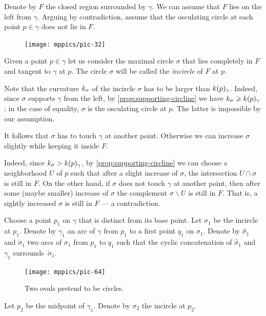 Denote by $F$ the closed region surrounded by $\gamma$.
We can assume that $F$ lies on the left from $\gamma$.
Arguing by contradiction,
assume that the osculating circle at each point $p\in \gamma$ does not lie in $F$.

\begin{figure}[h!]%
\vskip-0mm
\centering
\texttt{[image: mppics/pic-32]}
\vskip0mm
\end{figure}

Given a point $p\in\gamma$ let us consider the maximal circle $\sigma$ that lies completely in $F$ and tangent to $\gamma$ at $p$.
The circle $\sigma$ will be called the {}\emph{incircle} of $F$ at $p$.

Note that the curvature $k_\sigma$ of the incircle $\sigma$ has to be larger than $k(p)_\gamma$.
Indeed, since $\sigma$ supports $\gamma$ from the left, by \ref{prop:supporting-circline} we have $k_\sigma\geqslant k(p)_\gamma$; in the case of equality, $\sigma$ is the osculating circle at $p$.
The latter is impossible by our assumption.

It follows that $\sigma$ has to touch $\gamma$ at another point.
Otherwise we can increase $\sigma$ slightly while keeping it inside $F$.

Indeed, since $k_\sigma> k(p)_\gamma$, 
by \ref{prop:supporting-circline} we can choose a neighborhood $U$ of $p$ such that after a slight increase of $\sigma$, the intersection $U\cap \sigma$ is still in $F$.
On the other hand, if $\sigma$ does not touch $\gamma$ at another point, then after some (maybe smaller) increase of $\sigma$ the complement $\sigma\backslash U$ is still in $F$.
That is, a sightly increased $\sigma$ is still in $F$ --- a contradiction.



Choose a point $p_1$ on $\gamma$ that is distinct from its base point. 
Let $\sigma_1$ be the incircle at $p_1$.
Denote by $\gamma_1$ an arc of $\gamma$ from $p_1$ to a first point $q_1$ on $\sigma_1$.
Denote by $\hat\sigma_1$ and $\check\sigma_1$ two arcs of $\sigma_1$ from $p_1$ to $q_1$ such that the cyclic concatenation of $\hat\sigma_1$ and $\gamma_1$ surrounds~$\check\sigma_1$. 

\begin{figure}
\vskip-2mm
\centering
\texttt{[image: mppics/pic-64]}
\caption*{Two ovals pretend to be circles.}
\vskip0mm
\end{figure}

Let $p_2$ be the midpoint of $\gamma_1$.
Denote by $\sigma_2$ the incircle at $p_2$.

